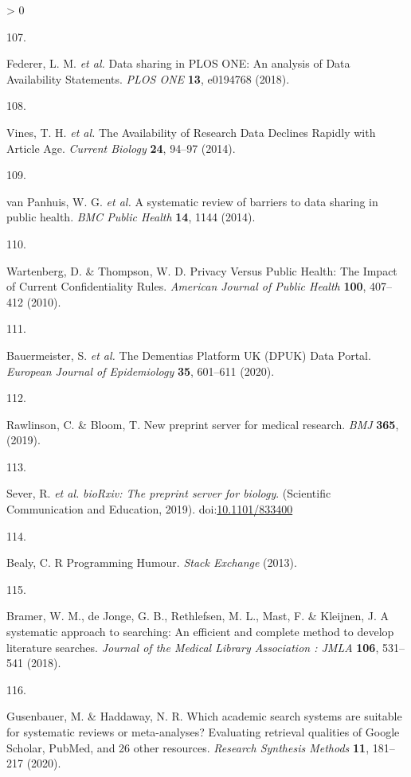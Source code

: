 \documentclass[a4paper, twoside]{templates/ociamthesis}
\newlength{\cslhangindent}
\newlength{\csllabelwidth}
\newenvironment{CSLReferences}[3] %
 {%
  \setlength{\parindent}{0pt}
  \ifodd #1 \everypar{\setlength{\hangindent}{\cslhangindent}}\ignorespaces\fi
  \ifnum #2 > 0
  \setlength{\parskip}{#2\baselineskip}
  \fi
 }%
 {}
\newcommand{\CSLLeftMargin}[1]{\parbox[t]{\maxof{\widthof{#1}}{\csllabelwidth}}{#1}}
\newcommand{\CSLRightInline}[1]{\parbox[t]{\linewidth - \csllabelwidth}{#1}}
\begin{document}
\begin{CSLReferences}{0}{0}
\leavevmode\hypertarget{ref-federer2018}{}%
\CSLLeftMargin{107. }
\CSLRightInline{Federer, L. M. \emph{et al.} Data sharing in {PLOS ONE}: An analysis of {Data Availability Statements}. \emph{PLOS ONE} \textbf{13}, e0194768 (2018).}

\leavevmode\hypertarget{ref-vines2014}{}%
\CSLLeftMargin{108. }
\CSLRightInline{Vines, T. H. \emph{et al.} The {Availability} of {Research Data Declines Rapidly} with {Article Age}. \emph{Current Biology} \textbf{24}, 94--97 (2014).}

\leavevmode\hypertarget{ref-vanpanhuis2014}{}%
\CSLLeftMargin{109. }
\CSLRightInline{van Panhuis, W. G. \emph{et al.} A systematic review of barriers to data sharing in public health. \emph{BMC Public Health} \textbf{14}, 1144 (2014).}

\leavevmode\hypertarget{ref-wartenberg2010}{}%
\CSLLeftMargin{110. }
\CSLRightInline{Wartenberg, D. \& Thompson, W. D. Privacy {Versus Public Health}: The {Impact} of {Current Confidentiality Rules}. \emph{American Journal of Public Health} \textbf{100}, 407--412 (2010).}

\leavevmode\hypertarget{ref-bauermeister2020}{}%
\CSLLeftMargin{111. }
\CSLRightInline{Bauermeister, S. \emph{et al.} The {Dementias Platform UK} ({DPUK}) {Data Portal}. \emph{European Journal of Epidemiology} \textbf{35}, 601--611 (2020).}

\leavevmode\hypertarget{ref-rawlinson2019}{}%
\CSLLeftMargin{112. }
\CSLRightInline{Rawlinson, C. \& Bloom, T. New preprint server for medical research. \emph{BMJ} \textbf{365}, (2019).}

\leavevmode\hypertarget{ref-sever2019}{}%
\CSLLeftMargin{113. }
\CSLRightInline{Sever, R. \emph{et al.} \emph{{bioRxiv}: The preprint server for biology}. ({Scientific Communication and Education}, 2019). doi:\href{https://doi.org/10.1101/833400}{10.1101/833400}}

\leavevmode\hypertarget{ref-beely2013}{}%
\CSLLeftMargin{114. }
\CSLRightInline{Bealy, C. R {Programming Humour}. \emph{Stack Exchange} (2013).}

\leavevmode\hypertarget{ref-bramer2018}{}%
\CSLLeftMargin{115. }
\CSLRightInline{Bramer, W. M., de Jonge, G. B., Rethlefsen, M. L., Mast, F. \& Kleijnen, J. A systematic approach to searching: An efficient and complete method to develop literature searches. \emph{Journal of the Medical Library Association : JMLA} \textbf{106}, 531--541 (2018).}

\leavevmode\hypertarget{ref-gusenbauer2020}{}%
\CSLLeftMargin{116. }
\CSLRightInline{Gusenbauer, M. \& Haddaway, N. R. Which academic search systems are suitable for systematic reviews or meta-analyses? Evaluating retrieval qualities of {Google Scholar}, {PubMed}, and 26 other resources. \emph{Research Synthesis Methods} \textbf{11}, 181--217 (2020).}


\end{CSLReferences}
\end{document}
